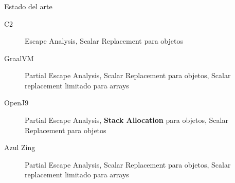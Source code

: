 \begin{frame}[fragile]
  \frametitle{\ft}
  \begin{block}{Estado del arte}
    \begin{description}
    \item[C2]
      Escape Analysis,
      Scalar Replacement para objetos
    \item[GraalVM]
      Partial Escape Analysis,
      Scalar Replacement para objetos,
      Scalar replacement limitado para arrays
    \item[OpenJ9]
      Partial Escape Analysis,
      {\bf Stack Allocation} para objetos,
      Scalar Replacement para objetos
    \item[Azul Zing]
      Partial Escape Analysis,
      Scalar Replacement para objetos,
      Scalar replacement limitado para arrays
    \end{description}
  \end{block}
\end{frame}    

